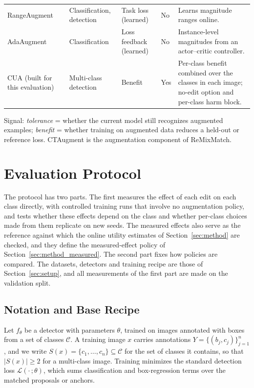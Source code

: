 \documentclass[conference]{IEEEtran}
\begin{document}
\begin{table}[t]
\begin{tabularx}{\textwidth}{@{}p{}p{}p{}p{}Y@{}}
RangeAugment~\cite{mehta2022rangeaugment} & Classification, detection & Task loss (learned) & No & Learns magnitude ranges online. \\
AdaAugment~\cite{yang2025adaaugment} & Classification & Loss feedback (learned) & No & Instance-level magnitudes from an actor--critic controller. \\
\midrule
CUA (built for this evaluation) & Multi-class detection & Benefit & Yes & Per-class benefit combined over the classes in each image; no-edit option and per-class harm block. \\
\bottomrule
\end{tabularx}
\vspace{3pt}
\begin{minipage}{\textwidth}
\footnotesize
Signal: \emph{tolerance} = whether the current model still recognizes augmented examples; \emph{benefit} = whether training on augmented data reduces a held-out or reference loss. CTAugment is the augmentation component of ReMixMatch.
\end{minipage}
\end{table}

\section{Evaluation Protocol}
\label{sec:protocol}
\label{sec:measurement}

The protocol has two parts. The first measures the effect of each edit on each class directly, with controlled training runs that involve no augmentation policy, and tests whether these effects depend on the class and whether per-class choices made from them replicate on new seeds. The measured effects also serve as the reference against which the online utility estimates of Section~\ref{sec:method} are checked, and they define the measured-effect policy of Section~\ref{sec:method_measured}. The second part fixes how policies are compared. The datasets, detectors and training recipe are those of Section~\ref{sec:setup}, and all measurements of the first part are made on the validation split.

\subsection{Notation and Base Recipe}
\label{sec:method_setup}

Let $f_\theta$ be a detector with parameters $\theta$, trained on images annotated with boxes from a set of classes $\mathcal{C}$. A training image $x$ carries annotations $Y=\{(b_j,c_j)\}_{j=1}^{n}$, and we write $S(x)=\{c_1,\dots,c_n\}\subseteq\mathcal{C}$ for the set of classes it contains, so that $|S(x)|\geq 2$ for a multi-class image. Training minimizes the standard detection loss $\mathcal{L}(\cdot\,;\theta)$, which sums classification and box-regression terms over the matched proposals or anchors.
\end{document}
